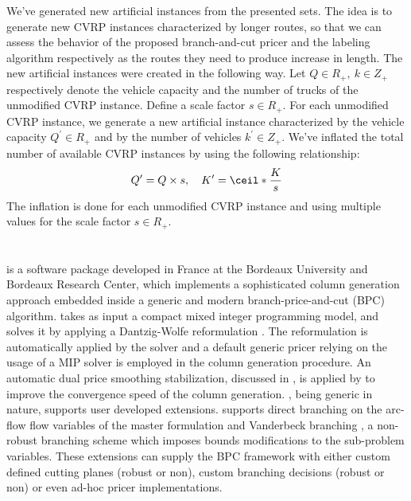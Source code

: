 \medskip

We've generated new artificial instances from the presented sets.
The idea is to generate new CVRP instances characterized by longer routes,
so that we can assess the behavior of the proposed branch-and-cut pricer
and the labeling algorithm respectively as the routes
they need to produce increase in length.
The new artificial instances were created in the following way.
Let $Q \in R_+,\ k \in Z_+$ respectively denote the vehicle
capacity and the number of trucks of the unmodified CVRP instance.
Define a scale factor $s \in R_+$.
For each unmodified CVRP instance, we generate a new artificial instance
characterized by the vehicle capacity $Q^\prime \in R_+$
and by the number of vehicles $k^\prime \in Z_+$.
We've inflated the total number of available CVRP instances
by using the following relationship:
$$
	Q^\prime = Q \times s, \quad K^\prime = \ceil*{\frac{K}{s}}
$$
The inflation is done for each unmodified CVRP instance and using
multiple values for the scale factor $s \in R_+$.

\section{\bapcod{}}
\label{sec:results-bapcod}

\bapcod{} \parencite{sadykov2021} is a software package
developed in France at the Bordeaux University and Bordeaux Research Center,
which implements a sophisticated column generation approach
embedded inside a generic and modern branch-price-and-cut (BPC) algorithm.
\bapcod{} takes as input a compact mixed integer programming model,
and solves it by applying a Dantzig-Wolfe reformulation \parencite{dantzig1960}.
The reformulation is automatically applied by the solver
and a default generic pricer relying on
the usage of a MIP solver is employed in the column generation procedure.
An automatic dual price smoothing stabilization, discussed in \textcite{pessoa2018automation},
is applied by \bapcod{} to improve the convergence speed of the column generation.
\bapcod{}, being generic in nature,
supports user developed extensions.
\bapcod{} supports direct branching on the arc-flow flow variables of the master formulation
and Vanderbeck branching \parencite{vanderbeck2011}, a non-robust branching
scheme which imposes bounds modifications to the sub-problem variables.
These extensions can supply the BPC framework with either
custom defined cutting planes (robust or non), custom branching decisions (robust or non)
or even ad-hoc pricer implementations.

